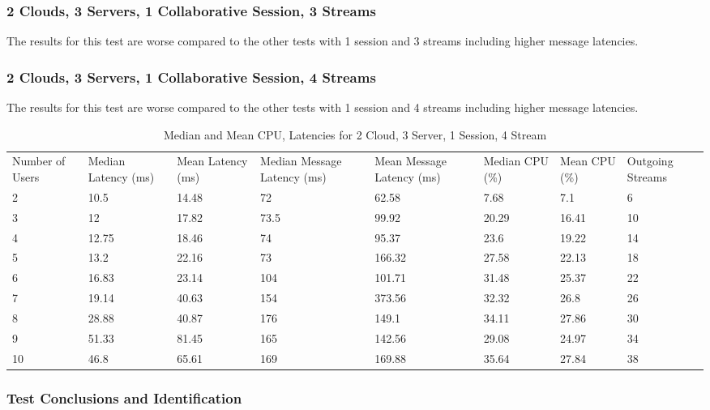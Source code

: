 \subsubsection{2 Clouds, 3 Servers, 1 Collaborative Session, 3 Streams}

The results for this test are worse compared to the other tests with 1 session and 3 streams including higher message latencies.

\subsubsection{2 Clouds, 3 Servers, 1 Collaborative Session, 4 Streams}

The results for this test are worse compared to the other tests with 1 session and 4 streams including higher message latencies.

\begin{table}
\caption{Median and Mean CPU, Latencies for 2 Cloud, 3 Server, 1 Session, 4 Stream}
\label{table:2cld_3serv_1sess_4str}
\begin{tabu} to\linewidth{|X[c]|X[c]|X[c]|X[c]|X[c]|X[c]|X[c]|X[c]|}
\everyrow{\hline}
\hline
Number of Users & Median Latency (ms) & Mean Latency (ms) & Median Message Latency (ms) & Mean Message Latency (ms) & Median CPU (\%) & Mean CPU (\%) & Outgoing Streams\\
2 & 10.5 & 14.48 & 72 & 62.58 & 7.68 & 7.1 & 6 \\
3 & 12 & 17.82 & 73.5 & 99.92 & 20.29 & 16.41 & 10 \\
4 & 12.75 & 18.46 & 74 & 95.37 & 23.6 & 19.22 & 14 \\
5 & 13.2 & 22.16 & 73 & 166.32 & 27.58 & 22.13 & 18 \\
6 & 16.83 & 23.14 & 104 & 101.71 & 31.48 & 25.37 & 22 \\
7 & 19.14 & 40.63 & 154 & 373.56 & 32.32 & 26.8 & 26 \\
8 & 28.88 & 40.87 & 176 & 149.1 & 34.11 & 27.86 & 30 \\
9 & 51.33 & 81.45 & 165 & 142.56 & 29.08 & 24.97 & 34 \\
10 & 46.8 & 65.61 & 169 & 169.88 & 35.64 & 27.84 & 38 \\
\end{tabu}
\end{table}

\subsubsection{Test Conclusions and Identification}

